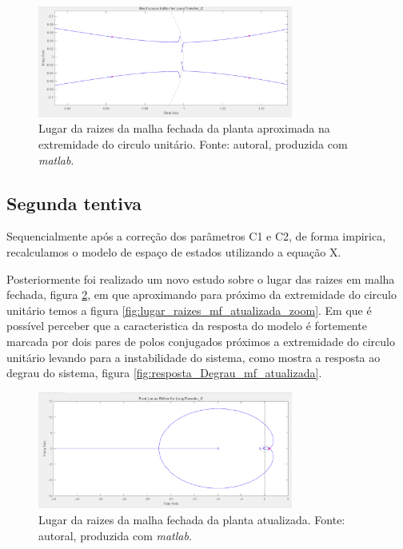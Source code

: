 \documentclass{ifacconf}
\begin{document}
\begin{figure}[!htb]
  \begin{center}
  \includegraphics[width=8.4cm]{figures/lugar_raizes_mf_aproximada.png}    %
  \caption{Lugar da raizes da malha fechada da planta aproximada na extremidade do circulo unitário. Fonte: autoral, produzida com \textit{matlab}.} 
  \label{fig:lugar_raizes_mf_aproximada}
  \end{center}
\end{figure}

\subsection{Segunda tentiva} %
Sequencialmente após a correção dos parâmetros C1 e C2, de forma impirica, recalculamos o modelo de espaço de estados utilizando a equação X.

Posteriormente foi realizado um novo estudo sobre o lugar das raizes em malha fechada, figura \ref{fig:lugar_raizes_mf_atualizada}, em que
aproximando para próximo da extremidade do circulo unitário temos a figura \ref{fig:lugar_raizes_mf_atualizada_zoom}. 
Em que é possível perceber que a caracteristica da resposta do modelo é fortemente marcada por dois pares de polos conjugados
próximos a extremidade do circulo unitário levando para a instabilidade do sistema, como mostra a resposta ao degrau do sistema, figura \ref{fig:resposta_Degrau_mf_atualizada}.

\begin{figure}[!htb]
  \begin{center}
  \includegraphics[width=8.4cm]{figures/lugar_raizes_mf_corrigida.png}    %
  \caption{Lugar da raizes da malha fechada da planta atualizada. Fonte: autoral, produzida com \textit{matlab}.} 
  \label{fig:lugar_raizes_mf_atualizada}
  \end{center}
\end{figure}
\end{document}
